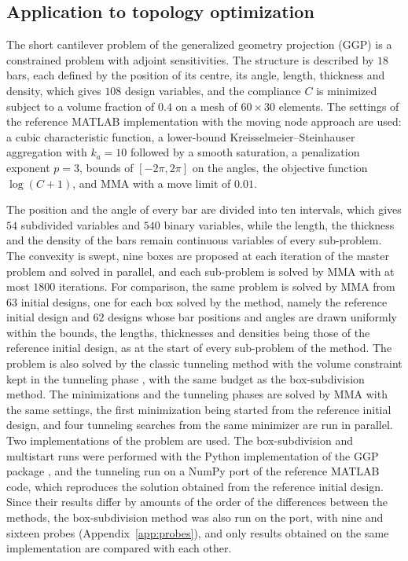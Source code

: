 \documentclass[pdflatex,sn-basic]{sn-jnl}
\begin{document}
\subsection{Application to topology optimization}\label{sec:cantilever}

The short cantilever problem of the generalized geometry projection (GGP)
\citep{coniglio2020,ggpcode} is a constrained problem with adjoint sensitivities.
The structure is described by $18$ bars, each defined by the position of its
centre, its angle, length, thickness and density, which gives $108$ design
variables, and the compliance $C$ is minimized subject to a volume fraction of
$0.4$ on a mesh of $60\times 30$ elements. The settings of the reference MATLAB
implementation with the moving node approach are used: a cubic characteristic
function, a lower-bound Kreisselmeier--Steinhauser aggregation
\citep{kreisselmeier1979} with $k_a = 10$ followed by a smooth saturation, a
penalization exponent $p = 3$, bounds of $[-2\pi, 2\pi]$ on the angles, the
objective function $\log(C+1)$, and MMA \citep{svanberg1987} with a move limit of
$0.01$.

The position and the angle of every bar are divided into ten intervals, which
gives $54$ subdivided variables and $540$ binary variables, while the length, the
thickness and the density of the bars remain continuous variables of every
sub-problem. The convexity is swept, nine boxes are proposed at each iteration of
the master problem and solved in parallel, and each sub-problem is solved by MMA
with at most $1800$ iterations. For comparison, the same problem is solved by MMA
from $63$ initial designs, one for each box solved by the method, namely the
reference initial design and $62$ designs whose bar positions and angles are
drawn uniformly within the bounds, the lengths, thicknesses and densities being
those of the reference initial design, as at the start of every sub-problem of
the method. The problem is also solved by the classic
tunneling method with the volume constraint kept in the tunneling phase
\citep{levy1985,levygomez1985}, with the same budget as the box-subdivision
method. The minimizations and the tunneling phases are solved by MMA with the
same settings, the first minimization being started from the reference initial
design, and four tunneling searches from the same minimizer are run in
parallel. Two implementations of the problem are used. The box-subdivision and
multistart runs were performed with the Python implementation of the GGP
package \citep{ggpcode}, and the tunneling run on a NumPy port of the reference
MATLAB code, which reproduces the solution obtained from the reference initial
design. Since their results differ by amounts of the order of the differences
between the methods, the box-subdivision method was also run on the port, with
nine and sixteen probes (Appendix~\ref{app:probes}), and only results obtained
on the same implementation are compared with each other.
\end{document}
